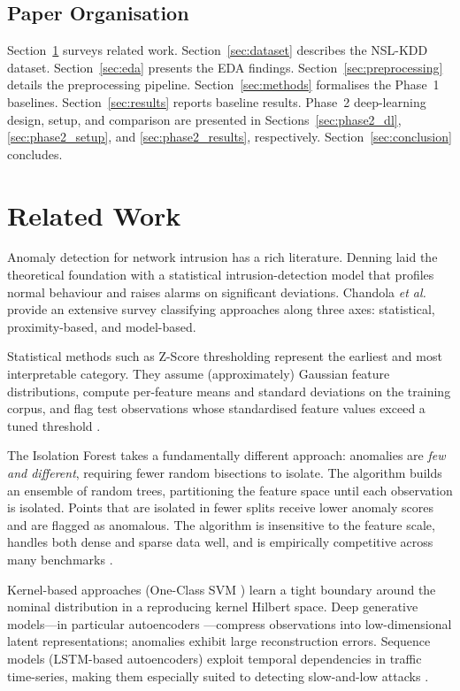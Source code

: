\documentclass[conference]{IEEEtran}
\begin{document}
\subsection{Paper Organisation}
Section~\ref{sec:related} surveys related work.  Section~\ref{sec:dataset} describes
the NSL-KDD dataset.  Section~\ref{sec:eda} presents the EDA findings.
Section~\ref{sec:preprocessing} details the preprocessing pipeline.
Section~\ref{sec:methods} formalises the Phase~1 baselines. Section~\ref{sec:results}
reports baseline results. Phase~2 deep-learning design, setup, and comparison are
presented in Sections~\ref{sec:phase2_dl}, \ref{sec:phase2_setup}, and
\ref{sec:phase2_results}, respectively. Section~\ref{sec:conclusion} concludes.

\section{Related Work}
\label{sec:related}

Anomaly detection for network intrusion has a rich literature.  Denning
\cite{denning1987} laid the theoretical foundation with a statistical
intrusion-detection model that profiles normal behaviour and raises alarms on
significant deviations.  Chandola \emph{et al.}\ \cite{chandola2009} provide an
extensive survey classifying approaches along three axes: statistical, proximity-based,
and model-based.

Statistical methods such as Z-Score thresholding represent the earliest and most
interpretable category.  They assume (approximately) Gaussian feature distributions,
compute per-feature means and standard deviations on the training corpus, and flag
test observations whose standardised feature values exceed a tuned threshold
\cite{denning1987}.

The Isolation Forest \cite{liu2008} takes a fundamentally different approach:
anomalies are \emph{few and different}, requiring fewer random bisections to
isolate.  The algorithm builds an ensemble of random trees, partitioning the feature
space until each observation is isolated.  Points that are isolated in fewer splits
receive lower anomaly scores and are flagged as anomalous.  The algorithm is
insensitive to the feature scale, handles both dense and sparse data well, and is
empirically competitive across many benchmarks \cite{liu2008}.

Kernel-based approaches (One-Class SVM \cite{scholkopf2001}) learn a tight
boundary around the nominal distribution in a reproducing kernel Hilbert space.
Deep generative models---in particular autoencoders \cite{sakurada2014}---compress
observations into low-dimensional latent representations; anomalies exhibit large
reconstruction errors.  Sequence models (LSTM-based autoencoders) exploit temporal
dependencies in traffic time-series, making them especially suited to detecting
slow-and-low attacks \cite{chandola2009}.
\end{document}
